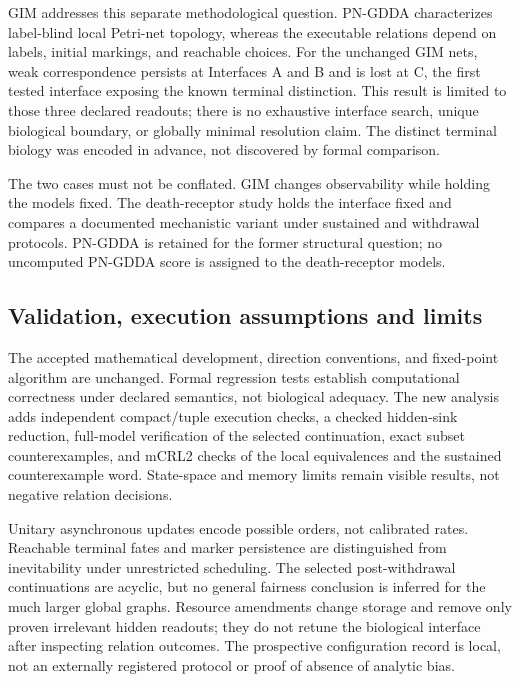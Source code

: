 \documentclass{ws-jbcb}
\numberwithin{equation}{section}
\begin{document}
GIM addresses this separate methodological question. PN-GDDA characterizes
label-blind local Petri-net topology,\cite{Szawulak2022} whereas the executable
relations depend on labels, initial markings, and reachable choices. For the
unchanged GIM nets, weak correspondence persists at Interfaces A and B and
is lost at C, the first tested interface exposing the known terminal
distinction. This result is limited to those three declared readouts; there is
no exhaustive interface search, unique biological boundary, or globally minimal
resolution claim. The distinct terminal biology was encoded in advance, not
discovered by formal comparison.

The two cases must not be conflated. GIM changes observability while holding
the models fixed. The death-receptor study holds the interface fixed and
compares a documented mechanistic variant under sustained and withdrawal
protocols. PN-GDDA is retained for the former structural question; no uncomputed
PN-GDDA score is assigned to the death-receptor models.

\subsection{Validation, execution assumptions and limits}

The accepted mathematical development, direction conventions, and fixed-point
algorithm are unchanged. Formal regression tests establish computational
correctness under declared semantics, not biological adequacy. The new analysis
adds independent compact/tuple execution checks, a checked hidden-sink
reduction, full-model verification of the selected continuation, exact subset
counterexamples, and mCRL2 checks of the local equivalences and the sustained
counterexample word. State-space and
memory limits remain visible results, not negative relation decisions.

Unitary asynchronous updates encode possible orders, not calibrated rates.
Reachable terminal fates and marker persistence are distinguished from
inevitability under unrestricted scheduling. The selected post-withdrawal
continuations are acyclic, but no general fairness conclusion is inferred for
the much larger global graphs. Resource amendments change storage and remove
only proven irrelevant hidden readouts; they do not retune the biological
interface after inspecting relation outcomes. The prospective configuration
record is local, not an externally registered protocol or proof of absence
of analytic bias.
\end{document}
